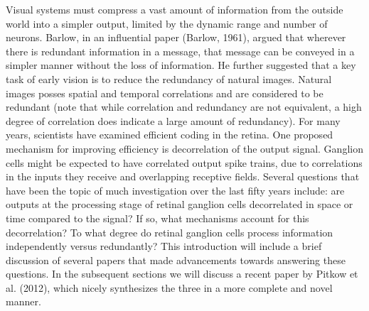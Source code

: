 \documentclass[12pt]{article}
\begin{document}
Visual systems must compress a vast amount of information from the outside world into a simpler output, limited by the dynamic range and number of neurons. Barlow, in an influential paper (Barlow, 1961), argued that wherever there is redundant information in a message, that message can be conveyed in a simpler manner without the loss of information. He further suggested that a key task of early vision is to reduce the redundancy of natural images. Natural images posses spatial and temporal correlations and are considered to be redundant (note that while correlation and redundancy are not equivalent, a high degree of correlation does indicate a large amount of redundancy). For many years, scientists have examined efficient coding in the retina. One proposed mechanism for improving efficiency is decorrelation of the output signal. Ganglion cells might be expected to have correlated output spike trains, due to correlations in the inputs they receive and overlapping receptive fields. Several questions that have been the topic of much investigation over the last fifty years include: are outputs at the processing stage of retinal ganglion cells decorrelated in space or time compared to the signal? If so, what mechanisms account for this decorrelation? To what degree do retinal ganglion cells process information independently versus redundantly? This introduction will include a brief discussion of several papers that made advancements towards answering these questions. In the subsequent sections we will discuss a recent paper by Pitkow et al. (2012), which nicely synthesizes the three in a more complete and novel manner.
\end{document}
